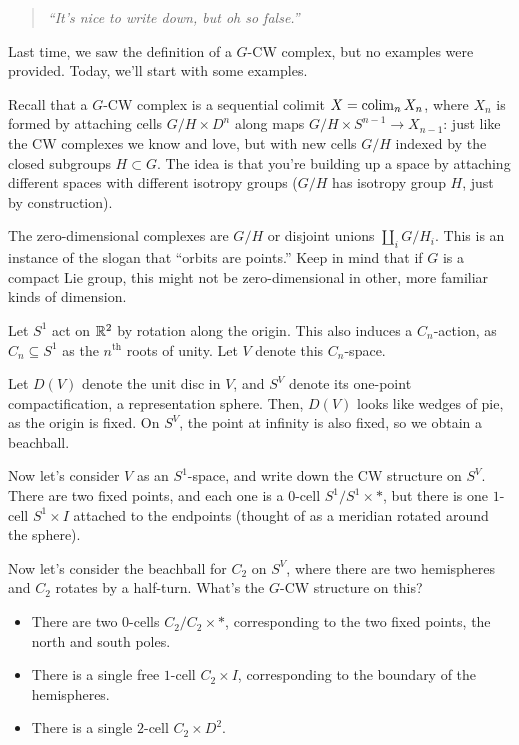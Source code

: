 \begin{quote}\textit{
	``It's nice to write down, but oh so false.''
}\end{quote}
Last time, we saw the definition of a $G$-CW complex, but no examples were provided. Today, we'll start with some
examples.

Recall that a $G$-CW complex is a sequential colimit $X = \operatorname{colim}_n X_n$, where $X_n$ is formed by attaching cells
$G/H\times D^n$ along maps $G/H\times S^{n-1}\to X_{n-1}$: just like the CW complexes we know and love, but with
new cells $G/H$ indexed by the closed subgroups $H\subset G$. The idea is that you're building up a space by
attaching different spaces with different isotropy groups ($G/H$ has isotropy group $H$, just by construction).
\begin{exm}
The zero-dimensional complexes are $G/H$ or disjoint unions $\amalg_i G/H_i$. This is an instance of the slogan
that ``orbits are points.'' Keep in mind that if $G$ is a compact Lie group, this might not be zero-dimensional in
other, more familiar kinds of dimension.
\end{exm}
\begin{exm}
Let $S^1$ act on $\mathbb R^2$ by rotation along the origin. This also induces a $C_n$-action, as $C_n\subseteq S^1$ as
the $n^{\text{th}}$ roots of unity. Let $V$ denote this $C_n$-space.

Let $D(V)$ denote the unit disc in $V$, and $S^V$ denote its one-point compactification, a representation sphere.
Then, $D(V)$ looks like wedges of pie, as the origin is fixed. On $S^V$, the point at infinity is also fixed, so we
obtain a beachball. %

Now let's consider $V$ as an $S^1$-space, and write down the CW structure on $S^V$. There are two fixed points, and
each one is a $0$-cell $S^1/S^1\times *$, but there is one $1$-cell $S^1\times I$ attached to the endpoints
(thought of as a meridian rotated around the sphere).

Now let's consider the beachball for $C_2$ on $S^V$, where there are two hemispheres and $C_2$ rotates by a
half-turn. What's the $G$-CW structure on this?
\begin{itemize}
	\item There are two $0$-cells $C_2/C_2\times *$, corresponding to the two fixed points, the north and south
	poles.
	\item There is a single free $1$-cell $C_2\times I$, corresponding to the boundary of the hemispheres.
	\item There is a single $2$-cell $C_2\times D^2$.\qedhere
\end{itemize}
\end{exm}
